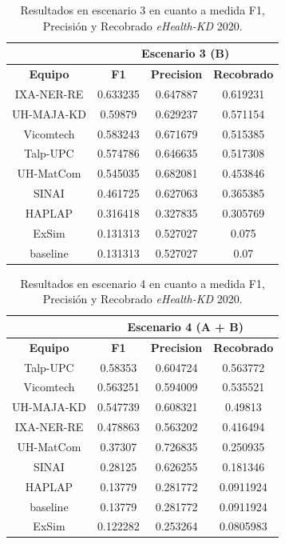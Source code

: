 \begin{table}[tb!]\centering
	\caption{Resultados en escenario 3 en cuanto a medida F1, Precisi\'on y Recobrado \textit{eHealth-KD} 2020. \label{table:results_20_escenario3}}
	\begin{tabular}{|c|c|c|c|}
		\hline
		&  \multicolumn{3}{c|}{\textbf{Escenario 3 (B)}} \\
		\hline
		\textbf{Equipo} & \textbf{F1} & \textbf{Precision} & \textbf{Recobrado} \\
		\hline
		IXA-NER-RE & 0.633235 & 0.647887 & 0.619231 \\
		UH-MAJA-KD & 0.59879 & 0.629237 & 0.571154 \\
		Vicomtech & 0.583243 & 0.671679 & 0.515385 \\
		Talp-UPC & 0.574786 & 0.646635 & 0.517308 \\
		UH-MatCom & 0.545035 & 0.682081 & 0.453846 \\
		SINAI & 0.461725 & 0.627063 & 0.365385 \\
		HAPLAP & 0.316418 & 0.327835 & 0.305769 \\
		ExSim & 0.131313 & 0.527027 & 0.075 \\
		baseline & 0.131313 & 0.527027 & 0.07 \\	
		\hline
	\end{tabular}
\end{table}

\begin{table}[tb!]\centering
	\caption{Resultados en escenario 4 en cuanto a medida F1, Precisi\'on y Recobrado \textit{eHealth-KD} 2020. \label{table:results_20_escenario4}}
	\begin{tabular}{|c|c|c|c|}
		\hline
		&  \multicolumn{3}{c|}{\textbf{Escenario 4 (A + B)}} \\
		\hline
		\textbf{Equipo} & \textbf{F1} & \textbf{Precision} & \textbf{Recobrado} \\
		\hline
		Talp-UPC & 0.58353 & 0.604724 & 0.563772 \\
		Vicomtech & 0.563251 & 0.594009 & 0.535521 \\
		UH-MAJA-KD & 0.547739 & 0.608321 & 0.49813 \\
		IXA-NER-RE & 0.478863 & 0.563202 & 0.416494 \\
		UH-MatCom & 0.37307 & 0.726835 & 0.250935 \\
		SINAI & 0.28125 & 0.626255 & 0.181346 \\
		HAPLAP & 0.13779 & 0.281772 & 0.0911924 \\
		baseline & 0.13779 & 0.281772 & 0.0911924 \\
		ExSim & 0.122282 & 0.253264 & 0.0805983 \\	
		\hline
	\end{tabular}
\end{table}

